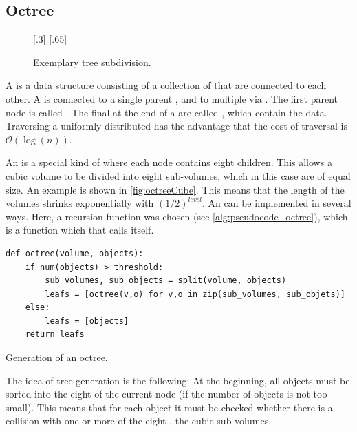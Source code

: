 \subsection{Octree}\label{sec:octree}
%
\begin{figure}[!t]
    \centering
    [.3\textwidth]{
    \def\tikzheight{0.6\textwidth}
    }
    \hfill
    [.65\textwidth]{
    \def\tikzheight{0.6\textwidth}
    }
	\caption{Exemplary tree subdivision.}
	\label{fig:octree}
\end{figure}
%
A  is a data structure consisting of a collection of  that are connected to each other.
A  is connected to a single parent , and to multiple  via .
The first parent node is called .
The final  at the end of a  are called , which contain the data.
Traversing a uniformly distributed  has the advantage that the cost of traversal is $\mathcal{O}(\log(n))$.
\par
%
An  is a special kind of  where each node contains eight children.
This allows a cubic volume to be divided into eight sub-volumes, which in this case are of equal size.
An example is shown in \cref{fig:octreeCube}.
This means that the length of the volumes shrinks exponentially with $(1/2)^\mathit{level}$.
An  can be implemented in several ways.
Here, a recursion function was chosen (see \cref{alg:pseudocode_octree}), which is a function which that calls itself.
%
\begin{lstfloat}[!tb]
\lstset{style=python}
\begin{lstlisting}[]
def octree(volume, objects):
    if num(objects) > threshold:
        sub_volumes, sub_objects = split(volume, objects)
        leafs = [octree(v,o) for v,o in zip(sub_volumes, sub_objets)]
    else:
        leafs = [objects]
    return leafs
\end{lstlisting}
\caption{Generation of an octree.}
\label{alg:pseudocode_octree}
\end{lstfloat}
%
The idea of tree generation is the following:
At the beginning, all objects must be sorted into the eight  of the current node (if the number of objects is not too small).
This means that for each object it must be checked whether there is a collision with one or more of the eight , \ie{} the cubic sub-volumes.
